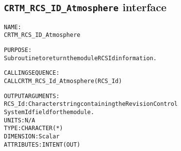 \subsection{\texttt{CRTM\_RCS\_ID\_Atmosphere} interface}
  \label{sec:CRTM_RCS_ID_Atmosphere_interface}
  \begin{alltt}
 
  NAME:
        CRTM_RCS_ID_Atmosphere
 
  PURPOSE:
        Subroutine to return the module RCS Id information.
 
  CALLING SEQUENCE:
        CALL CRTM_RCS_Id_Atmosphere( RCS_Id )
 
  OUTPUT ARGUMENTS:
        RCS_Id:        Character string containing the Revision Control
                       System Id field for the module.
                       UNITS:      N/A
                       TYPE:       CHARACTER(*)
                       DIMENSION:  Scalar
                       ATTRIBUTES: INTENT(OUT)
 
  \end{alltt}
